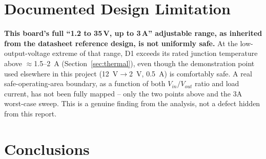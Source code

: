 \documentclass[11pt,letterpaper]{article}
\begin{document}
\section{Documented Design Limitation}

\textbf{This board's full ``1.2 to 35\,V, up to 3\,A'' adjustable range, as inherited from the datasheet
reference design, is not uniformly safe.} At the low-output-voltage extreme of that range, D1 exceeds its
rated junction temperature above $\approx$\SI{1.5}{}--\SI{2}{\ampere} (Section~\ref{sec:thermal}), even
though the demonstration point used elsewhere in this project (\SI{12}{\volt}$\to$\SI{2}{\volt},
\SI{0.5}{\ampere}) is comfortably safe. A real safe-operating-area boundary, as a function of both
$V_{in}/V_{out}$ ratio and load current, has not been fully mapped -- only the two points above and the
3A worst-case sweep. This is a genuine finding from the analysis, not a defect hidden from this report.

\section{Conclusions}
\label{sec:conclusions}
\end{document}
